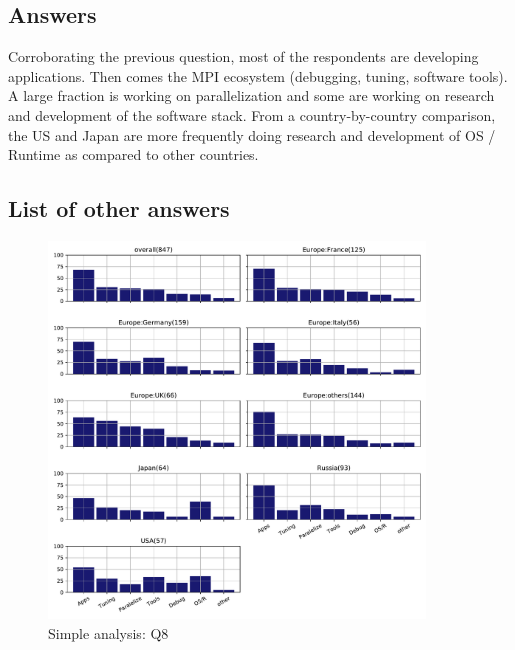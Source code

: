 
\subsection{Answers}



Corroborating the previous question, most of the respondents are developing
applications. Then comes the MPI ecosystem (debugging, tuning, software
tools). A large fraction is working on parallelization and some are working on
research and development of the software stack.
From a country-by-country comparison, the US 
and Japan are more frequently doing research and development 
of OS / Runtime as compared to other countries.


\subsection{List of other answers}
\begin{itemize}

\end{itemize}

\begin{figure}[htb]
\begin{center}
\includegraphics[width=10cm]{../pdfs/Q8.pdf}
\caption{Simple analysis: Q8}
\label{fig:Q8}
\end{center}
\end{figure}


